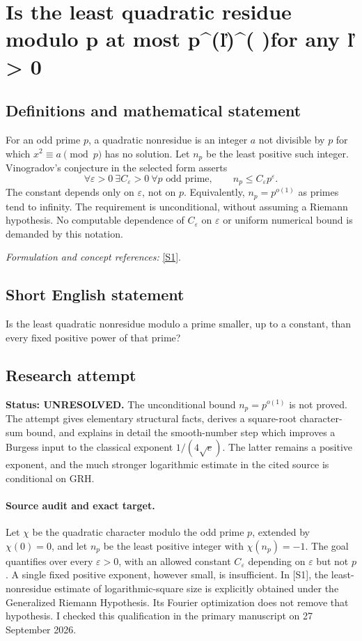 \documentclass[11pt]{article}
\begin{document}
\section*{\texorpdfstring{Is the least quadratic residue modulo p at most p\textasciicircum{}(ľ)\textasciicircum{}( )for any ľ > 0}{Is the least quadratic residue modulo p at most p\textasciicircum{}(ľ)\textasciicircum{}( )for any ľ > 0}}\label{statement}
\subsection{Definitions and mathematical statement}
For an odd prime $p$, a quadratic nonresidue is an integer $a$ not divisible by $p$ for which $x^2\equiv a\pmod p$ has no solution. Let $n_p$ be the least positive such integer. Vinogradov's conjecture in the selected form asserts
\[
 \forall{\varepsilon}>0\ \exists C_{\varepsilon}>0\ \forall p\text{ odd prime},
 \qquad n_p\le C_{\varepsilon} p^{\varepsilon}.
\]
The constant depends only on ${\varepsilon}$, not on $p$. Equivalently, $n_p=p^{o(1)}$ as primes tend to infinity. The requirement is unconditional, without assuming a Riemann hypothesis. No computable dependence of $C_{\varepsilon}$ on ${\varepsilon}$ or uniform numerical bound is demanded by this notation.
\par\smallskip\textit{Formulation and concept references:} \href{https://arxiv.org/pdf/2404.08380}{[S1]}.

\subsection{Short English statement}
Is the least quadratic nonresidue modulo a prime smaller, up to a constant, than every fixed positive power of that prime?
\subsection{Research attempt}
\textbf{Status: UNRESOLVED.} The unconditional bound $n_p=p^{o(1)}$ is not proved. The attempt gives elementary structural facts, derives a square-root character-sum bound, and explains in detail the smooth-number step which improves a Burgess input to the classical exponent $1/(4\sqrt e)$. The latter remains a positive exponent, and the much stronger logarithmic estimate in the cited source is conditional on GRH.

\paragraph{Source audit and exact target.}
Let $\chi$ be the quadratic character modulo the odd prime $p$, extended by $\chi(0)=0$, and let $n_p$ be the least positive integer with $\chi(n_p)=-1$. The goal quantifies over every $\varepsilon>0$, with an allowed constant $C_\varepsilon$ depending on $\varepsilon$ but not $p$. A single fixed positive exponent, however small, is insufficient. In [S1], the least-nonresidue estimate of logarithmic-square size is explicitly obtained under the Generalized Riemann Hypothesis. Its Fourier optimization does not remove that hypothesis. I checked this qualification in the primary manuscript on 27 September 2026.
\end{document}
